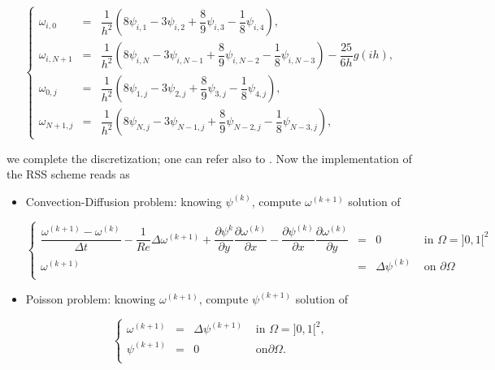 {\begin{center}
\begin{equation}\label{NS_extrap4}
\left\lbrace  \begin{array}{rcl}
\omega_{i,0} & = & \dfrac{1}{h^2} \left( 8 \psi_{i,1} - 3 \psi_{i,2} + \dfrac{8}{9} \psi_{i,3} - \dfrac{1}{8} \psi_{i,4} \right),\\
\omega_{i,N+1} & = & \dfrac{1}{h^2} \left( 8 \psi_{i,N} - 3 \psi_{i,N-1} + \dfrac{8}{9} \psi_{i,N-2} - \dfrac{1}{8} \psi_{i,N-3} \right) - \dfrac{25}{6h} g(ih), \\
\omega_{0,j} & = & \dfrac{1}{h^2} \left( 8 \psi_{1,j} - 3 \psi_{2,j} + \dfrac{8}{9} \psi_{3,j} - \dfrac{1}{8} \psi_{4, j} \right),\\
\omega_{N+1, j} & = & \dfrac{1}{h^2} \left( 8 \psi_{N,j} - 3 \psi_{N-1,j} + \dfrac{8}{9} \psi_{N-2,j} - \dfrac{1}{8} \psi_{N-3,j} \right),
\end{array}  \right. 
\end{equation}
\end{center}
we complete the discretization; one can refer also to \cite{ChengWang,LiTangFornberg}. Now the implementation of the RSS scheme reads as

\begin{itemize}
\item Convection-Diffusion problem: knowing $\psi^{(k)}$, compute $\omega^{(k+1)}$ solution of
\begin{center}
\begin{equation}
\left\lbrace  \begin{array}{rcll}
\dfrac{\omega^{(k+1)}-\omega^{(k)}}{\Delta t}-\dfrac{1}{Re} \Delta \omega^{(k+1)} + \dfrac{\partial \psi^k}{\partial y} \dfrac{\partial \omega^{(k)}}{\partial x}  -  \dfrac{\partial \psi^{(k)}}{\partial x} \dfrac{\partial \omega^{(k)}}{\partial y}& = & 0 & \text{ in } \Omega = ]0, 1[^2 \\
\omega^{(k+1)} & = & \Delta \psi^{(k)} & \text{ on } \partial \Omega \\
\end{array}  \right. 
\label{CD_NS}
\end{equation}
\end{center}
\item  Poisson problem: knowing $\omega^{(k+1)}$, compute $\psi^{(k+1)}$ solution of
\begin{center}
\begin{equation}
\left\lbrace  \begin{array}{rcll}
\omega^{(k+1)} & = & \Delta \psi^{(k+1)} & \text{ in } \Omega = ]0, 1[^2, \\
\psi^{(k+1)} & = & 0 & \text{ on} \partial \Omega .\\
\end{array}  \right. 
\label{Poisson_NS}
\end{equation}
\end{center}
\end{itemize}


}
